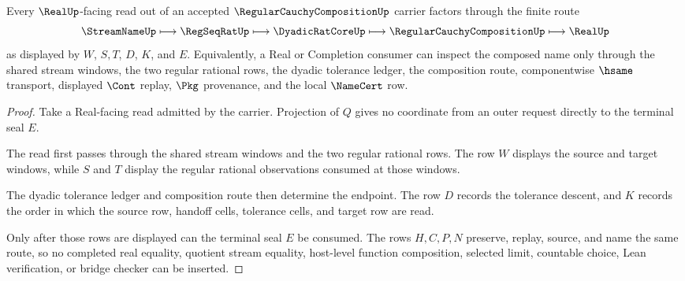 \begin{theorem}\label{thm:regular-cauchy-composition-real-seal-route}
Every $\RealUp$-facing read out of an accepted $\RegularCauchyCompositionUp$ carrier factors through the finite route
$$
\StreamNameUp \longmapsto \RegSeqRatUp \longmapsto \DyadicRatCoreUp \longmapsto \RegularCauchyCompositionUp \longmapsto \RealUp
$$
as displayed by $W$, $S,T$, $D$, $K$, and $E$. Equivalently, a Real or Completion consumer can inspect the composed name only through the shared stream windows, the two regular rational rows, the dyadic tolerance ledger, the composition route, componentwise $\hsame$ transport, displayed $\Cont$ replay, $\Pkg$ provenance, and the local $\NameCert$ row.
\end{theorem}
\begin{proof}
Take a Real-facing read admitted by the carrier. Projection of $Q$ gives no coordinate from an outer request directly to the terminal seal $E$.

The read first passes through the shared stream windows and the two regular rational rows. The row $W$ displays the source and target windows, while $S$ and $T$ display the regular rational observations consumed at those windows.

The dyadic tolerance ledger and composition route then determine the endpoint. The row $D$ records the tolerance descent, and $K$ records the order in which the source row, handoff cells, tolerance cells, and target row are read.

Only after those rows are displayed can the terminal seal $E$ be consumed. The rows $H,C,P,N$ preserve, replay, source, and name the same route, so no completed real equality, quotient stream equality, host-level function composition, selected limit, countable choice, Lean verification, or bridge checker can be inserted.
\end{proof}



